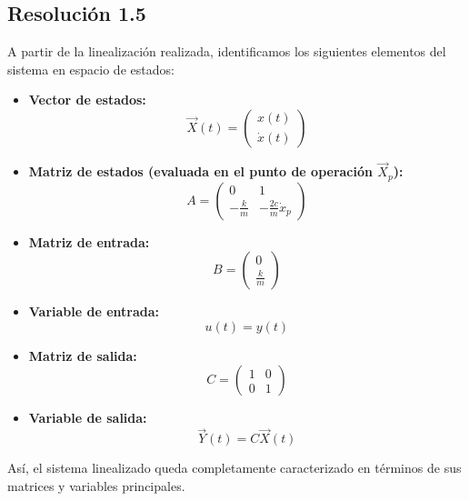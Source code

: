 \documentclass[
  11pt,
  letterpaper,
   addpoints,
   answers
  ]{exam}
\begin{document}
\begin{questions}
\begin{solution}
\subsection*{Resolución 1.5}
A partir de la linealización realizada, identificamos los siguientes elementos del sistema en espacio de estados:

\begin{itemize}
  \item \textbf{Vector de estados:}
  \begin{equation}
    \vec{X}(t) = \begin{pmatrix} x(t) \\ \dot{x}(t) \end{pmatrix}
  \end{equation}
  \item \textbf{Matriz de estados (evaluada en el punto de operación $\vec{X}_p$):}
  \begin{equation}
    A = \begin{pmatrix} 0 & 1 \\ -\frac{k}{m} & -\frac{2c}{m} \dot{x}_p \end{pmatrix}
  \end{equation}
  \item \textbf{Matriz de entrada:}
  \begin{equation}
    B = \begin{pmatrix} 0 \\ \frac{k}{m} \end{pmatrix}
  \end{equation}
  \item \textbf{Variable de entrada:}
  \begin{equation}
    u(t) = y(t)
  \end{equation}
  \item \textbf{Matriz de salida:}
  \begin{equation}
    C = \begin{pmatrix} 1 & 0 \\ 0 & 1 \end{pmatrix}
  \end{equation}
  \item \textbf{Variable de salida:}
  \begin{equation}
    \vec{Y}(t) = C \vec{X}(t)
  \end{equation}
\end{itemize}

Así, el sistema linealizado queda completamente caracterizado en términos de sus matrices y variables principales.
\end{solution}


\end{questions}
\end{document}
